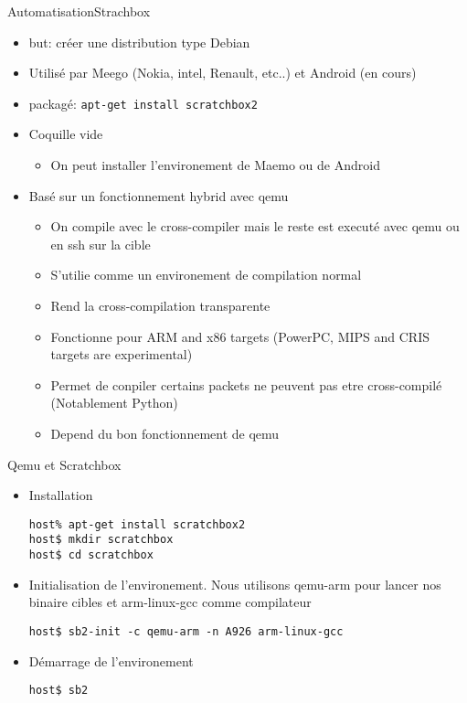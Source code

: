 \begin{frame}[fragile=singleslide]{Automatisation}{Strachbox}
  \begin{itemize}
  \item but: créer une distribution type Debian
  \item Utilisé  par Meego (Nokia,  intel, Renault, etc..)  et Android
    (en cours)
  \item packagé: \verb+apt-get install scratchbox2+
  \item Coquille vide
    \begin{itemize}
    \item On peut installer l'environement de Maemo ou de Android
    \end{itemize}
  \item Basé sur un fonctionnement hybrid avec qemu
    \begin{itemize}
    \item On compile avec le  cross-compiler mais le reste est executé
      avec qemu ou en ssh sur la cible
    \item S'utilie comme un environement de compilation normal
    \item Rend la cross-compilation transparente
    \item Fonctionne pour ARM and  x86 targets (PowerPC, MIPS and CRIS
      targets are experimental)
    \item  Permet de  conpiler certains  packets ne  peuvent  pas etre
      cross-compilé (Notablement Python)
    \item Depend du bon fonctionnement de qemu
    \end{itemize}
  \end{itemize}
\end{frame}

\begin{frame}[fragile=singleslide]{Qemu et Scratchbox}
  \begin{itemize} 
  \item Installation
    \begin{lstlisting}
host% apt-get install scratchbox2
host$ mkdir scratchbox
host$ cd scratchbox
    \end{lstlisting}
  \item Initialisation de l'environement. Nous utilisons qemu-arm pour
    lancer nos binaire cibles et arm-linux-gcc comme compilateur
    \begin{lstlisting} 
host$ sb2-init -c qemu-arm -n A926 arm-linux-gcc
    \end{lstlisting}
  \item Démarrage de l'environement 
    \begin{lstlisting} 
host$ sb2
    \end{lstlisting}
  \end{itemize}
\end{frame}

